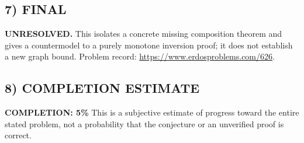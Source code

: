 \subsection*{7) FINAL}
\textbf{UNRESOLVED.} This isolates a concrete missing composition theorem and gives a countermodel to a purely monotone inversion proof; it does not establish a new graph bound.
\noindent Problem record: \url{https://www.erdosproblems.com/626}.

\subsection*{8) COMPLETION ESTIMATE}
\textbf{COMPLETION: 5\%}
This is a subjective estimate of progress toward the entire stated problem, not a probability that the conjecture or an unverified proof is correct.
